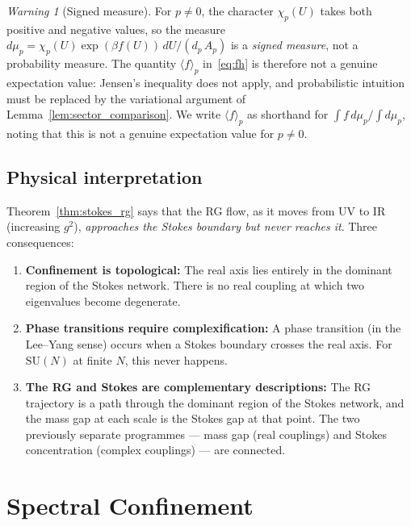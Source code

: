 \documentclass[12pt]{article}
\theoremstyle{definition}
\theoremstyle{remark}
\newtheorem{warning}[theorem]{Warning}
\newcommand{\SU}{\mathrm{SU}}
\begin{document}
\begin{warning}[Signed measure]
\label{warn:signed_measure}
For $p \ne 0$, the character $\chi_p(U)$ takes both positive and
negative values, so the measure
$d\mu_p = \chi_p(U)\exp(\beta f(U))\,dU / (d_p\,A_p)$
is a \emph{signed measure}, not a probability measure. The
quantity $\langle f \rangle_p$ in~\eqref{eq:fh} is
therefore not a genuine expectation value: Jensen's inequality
does not apply, and probabilistic intuition must be replaced by
the variational argument of Lemma~\ref{lem:sector_comparison}.
We write $\langle f \rangle_p$ as shorthand for
$\int f\,d\mu_p / \int d\mu_p$, noting that this is not a
genuine expectation value for $p \ne 0$.
\end{warning}

\subsection{Physical interpretation}

Theorem~\ref{thm:stokes_rg} says that the RG flow, as it moves from
UV to IR (increasing $g^2$), \emph{approaches the Stokes boundary
but never reaches it}. Three consequences:

\begin{enumerate}
\item \textbf{Confinement is topological:} The real axis lies entirely
  in the dominant region of the Stokes network. There is no real
  coupling at which two eigenvalues become degenerate.

\item \textbf{Phase transitions require complexification:} A phase
  transition (in the Lee--Yang sense) occurs when a Stokes boundary
  crosses the real axis. For $\SU(N)$ at finite $N$, this never
  happens.

\item \textbf{The RG and Stokes are complementary descriptions:} The
  RG trajectory is a path through the dominant region of the Stokes
  network, and the mass gap at each scale is the Stokes gap at that
  point. The two previously separate programmes --- mass gap (real
  couplings) and Stokes concentration (complex couplings) ---
  are connected.
\end{enumerate}

\section{Spectral Confinement}
\label{sec:confinement}
\end{document}

